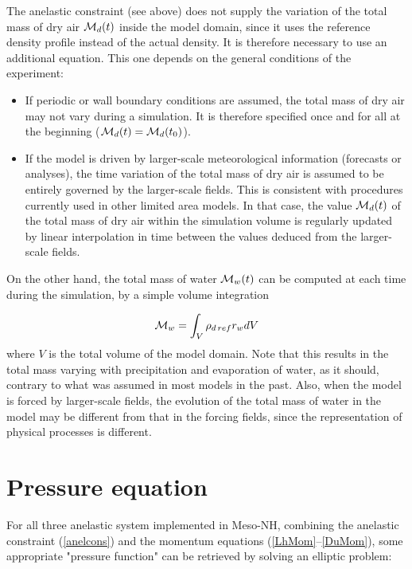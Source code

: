 The anelastic constraint (see above)
does not supply the variation of the total mass of dry air ${\cal M}_d (t)$
inside the model domain, since it uses the reference
density profile instead of the actual density. It is therefore necessary
to use an additional equation. This one depends on the general conditions
of the experiment:
\begin{itemize}
\item If periodic or wall boundary conditions are assumed, the total mass
of dry air may not vary during a simulation. It is therefore specified
once and for all at the beginning (${\cal M}_d(t)={\cal M}_d(t_0)$).
\item If the model is driven by larger-scale meteorological information
(forecasts or analyses), the time variation of the total mass of dry
air is assumed to be entirely governed by the larger-scale fields. This
is consistent with procedures currently used in other limited area models. In
that case, the value ${\cal M}_d(t)$ of the total mass of dry air within the
simulation volume is regularly updated by linear interpolation in time
between the values deduced from the larger-scale fields.
\end{itemize}

On the other hand, the total mass of water ${\cal M}_w(t)$ can be computed
at each time during the simulation, by a simple volume integration

\begin{equation}
{\cal M}_w = \int_V \rho_{d\,ref} r_w dV
\end{equation}
where $V$ is the total volume of the model domain. Note that this results
in the total mass varying with precipitation and evaporation of water,
as it should, contrary to what was assumed in most models in the past.
Also, when the model is forced by larger-scale fields, the evolution of
the total mass of water in the model may be different from
that in the forcing fields, since the representation
of physical processes is different.

\section{Pressure equation}

For all three anelastic system implemented in Meso-NH, combining the anelastic constraint
(\ref{anelcons}) and the momentum equations (\ref{LhMom}--\ref{DuMom}), some appropriate
"pressure function" can be retrieved by solving an elliptic problem:

